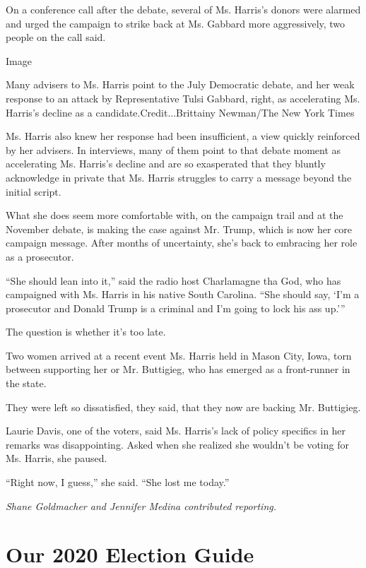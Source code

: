 On a conference call after the debate, several of Ms. Harris's donors
were alarmed and urged the campaign to strike back at Ms. Gabbard more
aggressively, two people on the call said.

Image

Many advisers to Ms. Harris point to the July Democratic debate, and her
weak response to an attack by Representative Tulsi Gabbard, right, as
accelerating Ms. Harris's decline as a candidate.Credit...Brittainy
Newman/The New York Times

Ms. Harris also knew her response had been insufficient, a view quickly
reinforced by her advisers. In interviews, many of them point to that
debate moment as accelerating Ms. Harris's decline and are so
exasperated that they bluntly acknowledge in private that Ms. Harris
struggles to carry a message beyond the initial script.

What she does seem more comfortable with, on the campaign trail and at
the November debate, is making the case against Mr. Trump, which is now
her core campaign message. After months of uncertainty, she's back to
embracing her role as a prosecutor.

``She should lean into it,'' said the radio host Charlamagne tha God,
who has campaigned with Ms. Harris in his native South Carolina. ``She
should say, `I'm a prosecutor and Donald Trump is a criminal and I'm
going to lock his ass up.'''

The question is whether it's too late.

Two women arrived at a recent event Ms. Harris held in Mason City, Iowa,
torn between supporting her or Mr. Buttigieg, who has emerged as a
front-runner in the state.

They were left so dissatisfied, they said, that they now are backing Mr.
Buttigieg.

Laurie Davis, one of the voters, said Ms. Harris's lack of policy
specifics in her remarks was disappointing. Asked when she realized she
wouldn't be voting for Ms. Harris, she paused.

``Right now, I guess,'' she said. ``She lost me today.''

\emph{Shane Goldmacher and Jennifer Medina contributed reporting.}

\hypertarget{our-2020-election-guide}{%
\section{Our 2020 Election Guide}\label{our-2020-election-guide}}

